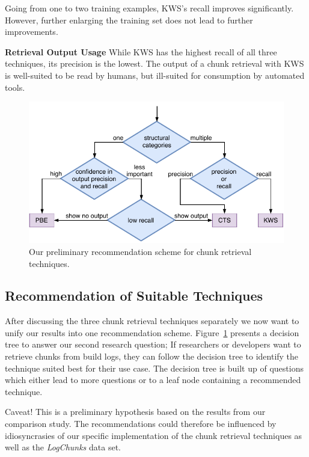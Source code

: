 Going from one to two training examples, KWS's recall improves
significantly.
However, further enlarging the training set
does not lead to further improvements.

\noindent
\textbf{Retrieval Output Usage}
While KWS has the highest recall of all three techniques, its
precision is the lowest.
The output of a chunk retrieval with KWS is
well-suited to be read by humans, but ill-suited for consumption by
automated tools.

\begin{figure}[tb]
		\centering
		\includegraphics[width=\columnwidth,
		clip]{img/crt-recommendation.pdf}
		\caption{Our preliminary recommendation scheme for chunk
		retrieval techniques.}
		\label{fig:crt-recommendation}
\end{figure}

\subsection{Recommendation of Suitable Techniques}
After discussing the three chunk retrieval techniques separately we
now want to unify our results into one recommendation scheme.
Figure~\ref{fig:crt-recommendation} presents a decision tree
to answer our second research question;
If researchers or developers want to retrieve chunks from build logs,
they can follow the decision tree to identify the technique
suited best for their use case.
The decision tree is built up of questions
which either lead to more questions or to a leaf node containing a
recommended technique.

\begin{simplebox}[minipage boxed title*=-7cm]{Caveat!}
This is a preliminary hypothesis based on the results
from our comparison study.
The recommendations could therefore be
influenced by idiosyncrasies of our specific implementation of the
chunk retrieval techniques as well as the \emph{LogChunks}
data set.
\end{simplebox}

